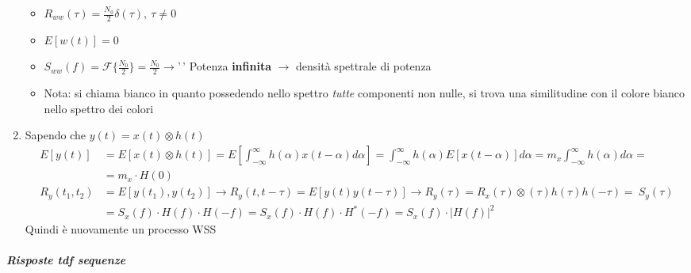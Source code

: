 \documentclass[
]{article}
\begin{document}
\begin{enumerate}
  \begin{itemize}
  \item
    \(R_{ww}(\tau) = \frac{N_0}{2} \delta(\tau), \ \tau \neq 0\)
  \item
    \(E[w(t)] = 0\)
  \item
    \(S_{ww}(f) = \mathcal{F} \{\frac{N_0}{2}\} = \frac{N_0}{2} \to\)'\,'
    Potenza \textbf{infinita} \(\to\) densità spettrale di potenza
  \item
    Nota: si chiama bianco in quanto possedendo nello spettro
    \emph{tutte} componenti non nulle, si trova una similitudine con il
    colore bianco nello spettro dei colori
  \end{itemize}
\item
  Sapendo che \(y(t) = x(t) \otimes h(t)\) \begin{align*}
  E[y(t)] &= E[x(t)\otimes h(t)] = E[\int_{-\infty}^{\infty} h(\alpha)x(t - \alpha) d\alpha]
  = \int_{-\infty}^{\infty} h(\alpha)E[x(t - \alpha)] d\alpha =
     m_x \int_{-\infty}^{\infty} h(\alpha) d\alpha =\\&= m_x \cdot H(0)
  \\ R_y(t_1, t_2) &= E[y(t_1), y(t_2)] \to R_y(t, t-\tau) =
    E[y(t)y(t-\tau)] \to R_y(\tau) = R_x(\tau) \otimes (\tau) h(\tau) h(-\tau)=
  \ S_y(\tau) \\ &= S_x(f) \cdot H(f) \cdot H(-f) = S_x(f) \cdot H(f) \cdot H^*(-f) = S_x(f) \cdot |H(f)|^2
  \end{align*} Quindi è nuovamente un processo WSS
\end{enumerate}

\subparagraph{Risposte tdf sequenze}\label{risposte-tdf-sequenze}
\end{document}
